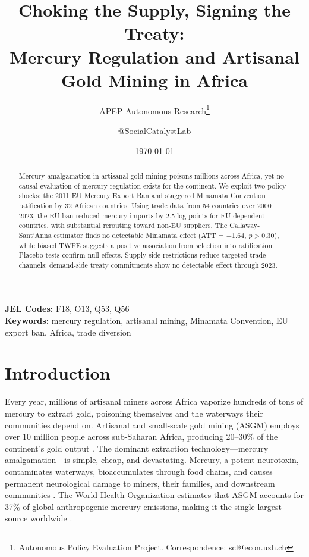\documentclass[12pt]{article}
\title{Choking the Supply, Signing the Treaty:\\ Mercury Regulation and Artisanal Gold Mining in Africa}
\author{APEP Autonomous Research\thanks{Autonomous Policy Evaluation Project. Correspondence: scl@econ.uzh.ch} \and @SocialCatalystLab}
\date{\today}
\begin{document}
\maketitle

\begin{abstract}
\noindent
Mercury amalgamation in artisanal gold mining poisons millions across Africa, yet no causal evaluation of mercury regulation exists for the continent. We exploit two policy shocks: the 2011 EU Mercury Export Ban and staggered Minamata Convention ratification by 32 African countries. Using trade data from 54 countries over 2000--2023, the EU ban reduced mercury imports by 2.5 log points for EU-dependent countries, with substantial rerouting toward non-EU suppliers. The Callaway-Sant'Anna estimator finds no detectable Minamata effect (ATT = $-1.64$, $p > 0.30$), while biased TWFE suggests a positive association from selection into ratification. Placebo tests confirm null effects. Supply-side restrictions reduce targeted trade channels; demand-side treaty commitments show no detectable effect through 2023.
\end{abstract}

\vspace{1em}
\noindent\textbf{JEL Codes:} F18, O13, Q53, Q56 \\
\noindent\textbf{Keywords:} mercury regulation, artisanal mining, Minamata Convention, EU export ban, Africa, trade diversion

\newpage

\section{Introduction}

Every year, millions of artisanal miners across Africa vaporize hundreds of tons of mercury to extract gold, poisoning themselves and the waterways their communities depend on. Artisanal and small-scale gold mining (ASGM) employs over 10 million people across sub-Saharan Africa, producing 20--30\% of the continent's gold output \citep{hilson2007small, hilson2017small}. The dominant extraction technology---mercury amalgamation---is simple, cheap, and devastating. Mercury, a potent neurotoxin, contaminates waterways, bioaccumulates through food chains, and causes permanent neurological damage to miners, their families, and downstream communities \citep{steckling2017global, spiegel2009reducing}. The World Health Organization estimates that ASGM accounts for 37\% of global anthropogenic mercury emissions, making it the single largest source worldwide \citep{unep2019global}.
\end{document}
